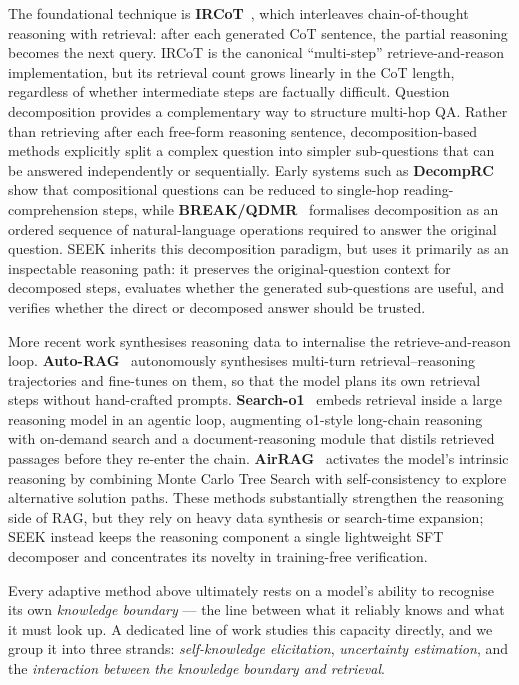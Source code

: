 The foundational technique is \textbf{IRCoT}~\cite{ircot}, which interleaves chain-of-thought reasoning with retrieval: after each generated CoT sentence, the partial reasoning becomes the next query. IRCoT is the canonical ``multi-step'' retrieve-and-reason implementation, but its retrieval count grows linearly in the CoT length, regardless of whether intermediate steps are factually difficult. Question decomposition provides a complementary way to structure multi-hop QA. Rather than retrieving after each free-form reasoning sentence, decomposition-based methods explicitly split a complex question into simpler sub-questions that can be answered independently or sequentially. Early systems such as \textbf{DecompRC}~\cite{decomprc} show that compositional questions can be reduced to single-hop reading-comprehension steps, while \textbf{BREAK/QDMR}~\cite{break_qdmr} formalises decomposition as an ordered sequence of natural-language operations required to answer the original question. SEEK inherits this decomposition paradigm, but uses it primarily as an inspectable reasoning path: it preserves the original-question context for decomposed steps, evaluates whether the generated sub-questions are useful, and verifies whether the direct or decomposed answer should be trusted.

More recent work synthesises reasoning data to internalise the retrieve-and-reason loop. \textbf{Auto-RAG}~\cite{autorag} autonomously synthesises multi-turn retrieval--reasoning trajectories and fine-tunes on them, so that the model plans its own retrieval steps without hand-crafted prompts. \textbf{Search-o1}~\cite{searcho1} embeds retrieval inside a large reasoning model in an agentic loop, augmenting o1-style long-chain reasoning with on-demand search and a document-reasoning module that distils retrieved passages before they re-enter the chain. \textbf{AirRAG}~\cite{airrag} activates the model's intrinsic reasoning by combining Monte Carlo Tree Search with self-consistency to explore alternative solution paths. These methods substantially strengthen the reasoning side of RAG, but they rely on heavy data synthesis or search-time expansion; SEEK instead keeps the reasoning component a single lightweight SFT decomposer and concentrates its novelty in training-free verification.

Every adaptive method above ultimately rests on a model's ability to recognise its own \emph{knowledge boundary} --- the line between what it reliably knows and what it must look up. A dedicated line of work studies this capacity directly, and we group it into three strands: \emph{self-knowledge elicitation}, \emph{uncertainty estimation}, and the \emph{interaction between the knowledge boundary and retrieval}.

